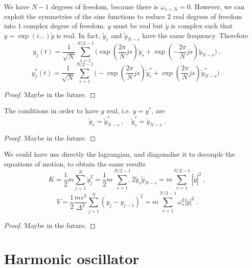     We have $N-1$ degrees of freedom, because there is $\omega_{s = N} = 0$. However, we can exploit the symmetries of the sine functions to reduce $2$ real degrees of freedom into $1$ complex degree of freedom. $y$ must be real but $\tilde y$ is complex such that $y = \exp(i \ldots) \tilde y$ is real. In fact, $\tilde y_s$ and $\tilde y_{N - s}$ have the same frequency. Therefore 
    \begin{equation*}
        y_j (t) = \frac{1}{\sqrt{N}} \sum_{s = 1}^{N/2 -1} \Big ( \exp(\frac{2\pi}{N} j s) \tilde y_s + \exp(- \frac{2\pi}{N} j s) \tilde y_{N - s} \Big) ~,
    \end{equation*}
    \begin{equation*}
        y_j^* (t) = \frac{1}{\sqrt{N}} \sum_{s = 1}^{N/2 -1} \Big (- \exp(\frac{2\pi}{N} j s) \tilde y_s^* + \exp(\frac{2\pi}{N} j s) \tilde y_{N - s}^* \Big) ~.
    \end{equation*}
    \begin{proof}
        Maybe in the future.
    \end{proof}
    The conditions in order to have $y$ real, i.e. $y = y^*$, are 
    \begin{equation*}
        \tilde y_s = \tilde y_{N-s}^* ~, \quad \tilde y_s^* = \tilde y_{N-s} ~.
    \end{equation*}
    \begin{proof}
        Maybe in the future.
    \end{proof}

    We could have use directly the lagrangian, and diagonalise it to decouple the equations of motion, to obtain the same results 
    \begin{equation*}
        K = \frac{1}{2} m \sum_{j=1}^{N} \dot y_j^2 = \frac{1}{2} m \sum_{s = 1}^{N/2 - 1} 2 \dot{\tilde y_s} \dot{\tilde y_{N-s}} = m \sum_{s=1}^{N/2 - 1} |\dot{\tilde y}|^2 ~,
    \end{equation*}
    \begin{equation*}
        V = \frac{1}{2} \frac{m v^2}{\Delta^2} \sum_{j=1}^{N} (y_j - y_{j-1})^2 = m \sum_{s=1}^{N/2 - 1} \omega^2_s |\tilde y|^2 ~.
    \end{equation*}
    \begin{proof}
        Maybe in the future.
    \end{proof}

\section{Harmonic oscillator}

